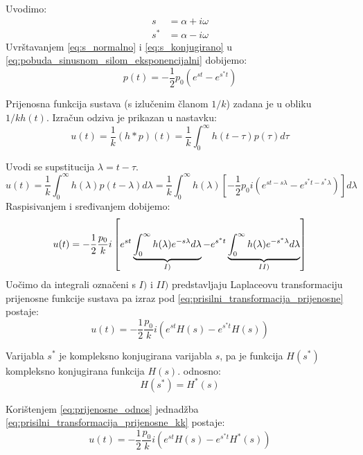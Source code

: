 Uvodimo:
\begin{align}
    s  &= \alpha + i\omega \label{eq:s_normalno}\\
    s^* &= \alpha - i\omega \label{eq:s_konjugirano}
\end{align}
Uvrštavanjem \eqref{eq:s_normalno} i \eqref{eq:s_konjugirano} u
\eqref{eq:pobuda_sinusnom_silom_eksponencijalni} dobijemo:
\begin{equation}\label{eq:pobuda_sinusnom_silom_konacno}
    p(t) = -\frac{1}{2}p_0(e^{st}-e^{s^*t})
\end{equation}

Prijenosna funkcija sustava (s izlučenim članom $1/k$) zadana je u obliku $1/k
h(t)$. Izračun odziva je prikazan u nastavku:
\[
    u(t) = \frac{1}{k}(h*p)(t) 
         = \frac{1}{k}\int_0^\infty h(t-\tau)p(\tau)d\tau
\]

Uvodi se supstitucija $\lambda=t-\tau$.
\[
    u(t) = \frac{1}{k}\int_0^\infty h(\lambda)p(t-\lambda)d\lambda
         = \frac{1}{k}\int_0^\infty h(\lambda)\left[
             -\frac{1}{2}p_0i\left(e^{st-s\lambda}-e^{s^*t-s^*\lambda}\right)
             \right]d\lambda
\]
Raspisivanjem i sređivanjem dobijemo:
\begin{equation}\label{eq:prisilni_transformacija_prijenosne}
    u(t) = -\frac{1}{2}\frac{p_0}{k}i \left[
                e^{st}
                \underbrace{
                    \int_0^\infty h(\lambda)e^{-s\lambda}d\lambda
                }_{\text{\textbf{$I)$}}}
                -e^{s^*t}
                \underbrace{
                    \int_0^\infty h(\lambda)e^{-s^*\lambda}d\lambda
                }_{\text{\textbf{$II)$}}}
        \right]
\end{equation}
Uočimo da integrali označeni s $I)\text{ i } II)$ predstavljaju Laplaceovu
transformaciju prijenosne funkcije sustava pa izraz pod \eqref{eq:prisilni_transformacija_prijenosne}
postaje:
\begin{equation}\label{eq:prisilni_transformacija_prijenosne_kk}
    u(t)=-\frac{1}{2}\frac{p_0}{k}i(e^{st}H(s)-e^{s^*t}H(s))
\end{equation}

Varijabla $s^*$ je kompleksno konjugirana varijabla $s$, pa je funkcija
$H(s^*)$ kompleksno konjugirana funkcija $H(s)$. odnosno:
\begin{equation}\label{eq:prijenosne_odnos}
    H(s^*)=H^*(s) 
\end{equation}

Korištenjem \eqref{eq:prijenosne_odnos} jednadžba \eqref{eq:prisilni_transformacija_prijenosne_kk}
postaje:
\begin{equation}\label{eq:prisilni_transformacija_prijenosne_hk}
    u(t)=-\frac{1}{2}\frac{p_0}{k}i (e^{st}H(s)-e^{s^*t}H^*(s))
\end{equation}

